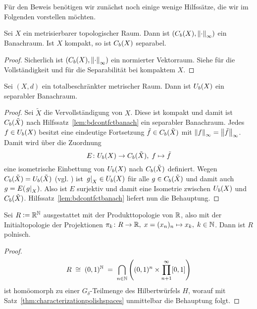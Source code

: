 \documentclass[../main/main.tex]{subfiles}
\begin{document}
	Für den Beweis benötigen wir zunächst noch einige wenige Hilfssätze, die wir im Folgenden vorstellen möchten.
	
	\begin{Hilfssatz}
		\label{lem:bdcontfctbanach}
		Sei $X$ ein metrisierbarer topologischer Raum. Dann ist $(C_b(X), \left\lVert\cdot\right\rVert_\infty)$ ein Banachraum. Ist $X$ kompakt, so ist $C_b(X)$ separabel.
	\end{Hilfssatz}

	\begin{proof}
		Sicherlich ist $(C_b(X), \left\lVert\cdot\right\rVert_\infty)$ ein normierter Vektorraum. Siehe \cite[Satz 2.1.6]{Simon.2015} für die Vollständigkeit und
		\cite[Satz 2.3.7]{Simon.2015} für die Separabilität bei kompaktem $X$.
	\end{proof}
	
	\begin{Hilfssatz}
		\label{lem:bduniffctbanach}
		Sei $(X, d)$ ein totalbeschränkter metrischer Raum. Dann ist $U_b(X)$ ein separabler Banachraum.
	\end{Hilfssatz}
	
	\begin{proof}
		Sei $\tilde{X}$ die Vervollständigung von $X$. Diese ist kompakt und damit ist $C_b(\tilde{X})$ nach Hilfssatz~\ref{lem:bdcontfctbanach} ein separabler Banachraum.
		Jedes $f \in U_b(X)$ besitzt eine eindeutige Fortsetzung $\tilde{f} \in C_b(\tilde{X})$ mit $\left\lVert f\right\rVert_\infty = \left\lVert\tilde{f}\right\rVert_\infty$. Damit wird über die Zuordnung
		\[ E \colon U_b(X) \to C_b(\tilde{X}), \; f \mapsto \tilde{f}  \]
		eine isometrische Einbettung von $U_b(X)$ nach $C_b(\tilde{X})$ definiert. 
		Wegen $C_b(\tilde{X}) = U_b(\tilde{X})$ (vgl. \cite[Satz 2.3.10]{Simon.2015}) ist $\left.g\right|_{X} \in U_b(X)$ für alle $g \in C_b(\tilde{X})$ und damit
		auch $g = E(\left.g\right|_{X})$. Also ist $E$ surjektiv und damit eine Isometrie zwischen $U_b(X)$ und $C_b(\tilde{X})$. Hilfssatz~\ref{lem:bdcontfctbanach} liefert nun die Behauptung.
	\end{proof}
	
	\begin{Hilfssatz}
		\label{lem:R}
		Sei $R \vcentcolon = \mathbb{R}^{\mathbb{N}}$ ausgestattet mit der Produkttopologie von $\mathbb{R}$, also mit der Initialtopologie der Projektionen $\pi_k \colon R \to \mathbb{R}, \; x = (x_n)_n \mapsto x_k , \; k \in \mathbb{N}$. Dann ist $R$ 
		polnisch.
	\end{Hilfssatz}
	
	\begin{proof}
		\[R \; \cong \; (0, 1)^{\mathbb{N}} \; = \; \bigcap_{n \in \mathbb{N}}  \left( (0, 1)^n \times \prod_{n+1}^{\infty} [0,1] \right) \]
		ist homöomorph zu einer $G_\delta$-Teilmenge des Hilbertwürfels $H$, worauf mit Satz~\ref{thm:characterizationpolishspaces} unmittelbar die Behauptung folgt.
	\end{proof}
\end{document}
